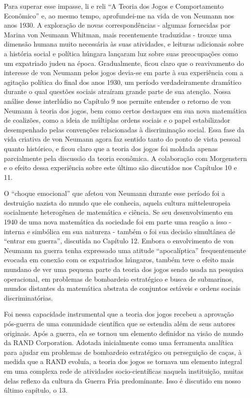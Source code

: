 \documentclass[12pt]{article}
\begin{document}
Para superar esse impasse, li e reli “A Teoria dos Jogos e Comportamento Econômico” e, ao mesmo tempo, aprofundei-me na vida de von Neumann nos anos 1930. A exploração de novas correspondências - algumas fornecidas por Marina von Neumann Whitman, mais recentemente traduzidas - trouxe uma dimensão humana muito necessária às suas atividades, e leituras adicionais sobre a história social e política húngara lançaram luz sobre suas preocupações como um expatriado judeu na época. Gradualmente, ficou claro que o reavivamento do interesse de von Neumann pelos jogos devia-se em parte à sua experiência com a agitação política do final dos anos 1930, um período verdadeiramente dramático durante o qual questões sociais atraíram grande parte de sua atenção. Nossa análise desse interlúdio no Capítulo 9 nos permite entender o retorno de von Neumann à teoria dos jogos, bem como certos destaques em sua nova matemática de coalizões, como a ideia de múltiplas ordens sociais e o papel estabilizador desempenhado pelas convenções relacionadas à discriminação social. Essa fase da vida criativa de von Neumann agora faz sentido tanto do ponto de vista pessoal quanto histórico, e ficou claro que a teoria dos jogos foi moldada apenas parcialmente pela discussão da teoria econômica. A colaboração com Morgenstern e o efeito dessa experiência sobre este último são discutidos nos Capítulos 10 e 11.

O “choque emocional” que afetou von Neumann durante esse período foi a destruição nazista do mundo que ele conhecia, aquela cultura mitteleuropeia socialmente heterogênea de matemática e ciência. Se seu desenvolvimento em 1940 de uma nova matemática da sociedade foi em parte uma reação a isso - interna e simbólica em sua natureza - também o foi sua decisão simultânea de “entrar em guerra”, discutida no Capítulo 12. Embora o envolvimento de von Neumann na guerra tenha expressado uma atitude “apocalíptica” frequentemente evocada em conexão com os expatriados húngaros, também teve o efeito mais mundano de ver uma pequena parte da teoria dos jogos sendo usada na pesquisa operacional, em problemas de bombardeio estratégico e busca de submarinos, mundos distantes da matemática abstrata de conjuntos estáveis e ordens sociais discriminatórias.

Foi nessa capacidade instrumental que a teoria dos jogos recebeu a aprovação pós-guerra de uma comunidade científica que se estendia além de seus autores originais. Após a guerra, ela se tornou um elemento definidor na visão de mundo da RAND Corporation. Adotada inicialmente como uma ferramenta analítica para ajudar em problemas de bombardeio estratégico ou perseguição de caças, à medida que a RAND evoluía, a teoria dos jogos se tornava um elemento integral em uma complexa rede de atividades socio-científicas naquela instituição, muitas delas reflexo da cultura da Guerra Fria predominante. Isso é discutido em nosso último capítulo, o 13.
\end{document}
